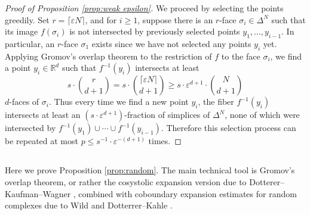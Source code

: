 \documentclass[12pt,a4paper,oneside]{amsart}\sloppy
\theoremstyle{definition}
\newcommand{\inv}[1]{#1^{-1}}
\begin{document}
\begin{proof}[Proof of Proposition \ref{prop:weak epsilon}]
We proceed by selecting the points greedily. Set $r = \lceil \varepsilon N \rceil$, and for $i\geq 1$, suppose there is an $r$-face $\sigma_i \in \Delta^N$ such that its image $f(\sigma_i)$ is not intersected by previously selected points $y_1, \dots, y_{i-1}$. In particular, an $r$-face $\sigma_1$ exists since we have not selected any points $y_i$ yet. Applying Gromov's overlap theorem to the restriction of $f$ to the face $\sigma_i$, we find a point $y_i\in \mathbb{R}^d$ such that $\inv{f}(y_i)$ intersects at least 
\[s\cdot \binom{r}{d+1} = s\cdot \binom{\lceil \varepsilon N\rceil}{d+1} \geq s\cdot \varepsilon^{d+1}\cdot \binom{N}{d+1}\]
$d$-faces of $\sigma_i$. Thus every time we find a new point $y_i$, the fiber $\inv{f}(y_i)$ intersects at least an $(s\cdot \varepsilon^{d+1})$-fraction of simplices of $\Delta^N$, none of which were intersected by $\inv{f}(y_1) \cup \cdots \cup \inv{f}(y_{i-1})$. Therefore this selection process can be repeated at most $p \leq s^{-1}\cdot \varepsilon^{-(d+1)}$ times. 
\end{proof}



\subsection{}
Here we prove Proposition \ref{prop:random}. The main technical tool is Gromov's overlap theorem, or rather the cosystolic expansion version due to Dotterer--Kaufman--Wagner \cite{dotterer_kaufman_wagner}, combined with coboundary expansion estimates for random complexes due to Wild \cite{wild_thesis} and Dotterrer--Kahle \cite{dotterer_kahle}.
\end{document}

